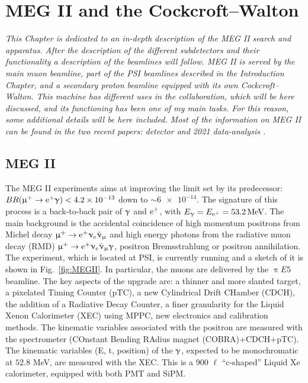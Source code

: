 \chapter{MEG II and the Cockcroft–Walton}
\label{ch:MEG}
\begin{refsection}
{\itshape This Chapter is dedicated to an in-depth description of the MEG II search and apparatus. After the description of the different subdetectors and their functionality a description of the beamlines will follow. MEG II is served by the main muon beamline, part of the PSI beamlines described in the Introduction Chapter, and a secondary proton beamline equipped with its own Cockcroft–Walton. This machine has different uses in the collaboration, which will be here discussed, and its functioning has been one of my main tasks. For this reason, some additional details will be here included. Most of the information on MEG II can be found in the two recent papers: detector \cite{MEG_II:detector} and 2021 data-analysis \cite{MEG_II:physics}.}

\section{MEG II}
    The MEG II experiments aims at improving the limit set by its predecessor: $BR(\upmu^+\rightarrow\text{e}^+\upgamma)<\num{4.2e-13}$ \cite{MEG} down to $\sim\num{6e-14}$.
    The signature of this process is a back-to-back pair of $\upgamma$ and $\text{e}^+$, with $E_\upgamma = E_{\text{e}^+} = \SI{53.2}{MeV}$.
    The main background is the accidental coincidence of high momentum positrons from Michel decay $\upmu^+ \rightarrow \text{e}^+ \upnu_e \bar{\upnu}_\upmu$ and high energy photons from the radiative muon decay (RMD) $\upmu^+\rightarrow\text{e}^+\upnu_e \bar{\upnu}_\upmu\upgamma$, positron Bremsstrahlung or positron annihilation.\\
    
    \noindent
    The experiment, which is located at PSI, is currently running and a sketch of it is shown in Fig.~\ref{fig:MEGII}.
    In particular, the muons are delivered by the $\uppi E5$ beamline.
    The key aspects of the upgrade are: a thinner and more slanted target, a pixelated Timing Counter (pTC), a new Cylindrical Drift CHamber (CDCH), the addition of a Radiative Decay Counter, a finer granularity for the Liquid Xenon Calorimeter (XEC) using MPPC, new electronics and calibration methods.
    The kinematic variables associated with the positron are measured with the spectrometer (COnstant Bending RAdius magnet (COBRA)+CDCH+pTC). 
    The kinematic variables (E, t, position) of the $\upgamma$, expected to be monochromatic at $52.8$ MeV, are measured with the XEC.
    This is a 900 $\ell$ ``c-shaped'' Liquid Xe calorimeter, equipped with both PMT and SiPM.
    

\end{refsection}
